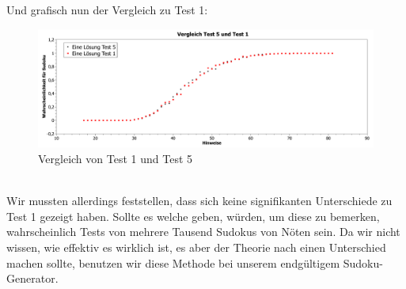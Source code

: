\documentclass[11pt,a4paper]{article}
\begin{document}
Und grafisch nun der Vergleich zu Test 1:
\ \\
\begin{figure}[htbp!]
\begin{center}
\includegraphics[width=1\textwidth]{test5ABB.pdf}
\end{center}
\caption{Vergleich von Test 1 und Test 5}
\end{figure}
\ \\
Wir mussten allerdings feststellen, dass sich keine signifikanten Unterschiede zu Test 1 gezeigt haben. Sollte es welche geben, würden, um diese zu bemerken, wahrscheinlich Tests von mehrere Tausend Sudokus von Nöten sein.
Da wir nicht wissen, wie effektiv es wirklich ist, es aber der Theorie nach einen Unterschied machen sollte, benutzen wir diese Methode bei unserem endgültigem Sudoku-Generator.  
\end{document}
